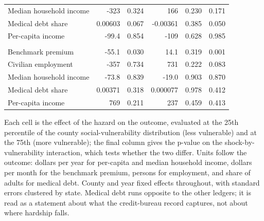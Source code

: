 \begin{table}[htbp]
\begin{tabularx}{\textwidth}{>{\raggedright\arraybackslash}X r r r r r}
Median household income & -323 & 0.324 & 166 & 0.230 & 0.171 \\
Medical debt share & 0.00603 & 0.067 & -0.00361 & 0.385 & 0.050 \\
Per-capita income & -99.4 & 0.854 & -109 & 0.628 & 0.985 \\
\addlinespace
\multicolumn{6}{l}{\textit{Extreme drought (2-year lag)}} \\
Benchmark premium & -55.1 & 0.030 & 14.1 & 0.319 & 0.001 \\
Civilian employment & -357 & 0.734 & 731 & 0.222 & 0.083 \\
Median household income & -73.8 & 0.839 & -19.0 & 0.903 & 0.870 \\
Medical debt share & 0.00371 & 0.318 & 0.000077 & 0.978 & 0.412 \\
Per-capita income & 769 & 0.211 & 237 & 0.459 & 0.413 \\
\bottomrule
\end{tabularx}
\begin{minipage}{\textwidth}\vspace{0.5em}\footnotesize
Each cell is the effect of the hazard on the outcome, evaluated at the 25th percentile of the county social-vulnerability distribution (less vulnerable) and at the 75th (more vulnerable); the final column gives the p-value on the shock-by-vulnerability interaction, which tests whether the two differ. Units follow the outcome: dollars per year for per-capita and median household income, dollars per month for the benchmark premium, persons for employment, and share of adults for medical debt. County and year fixed effects throughout, with standard errors clustered by state. Medical debt runs opposite to the other ledgers; it is read as a statement about what the credit-bureau record captures, not about where hardship falls.
\end{minipage}
\end{table}
